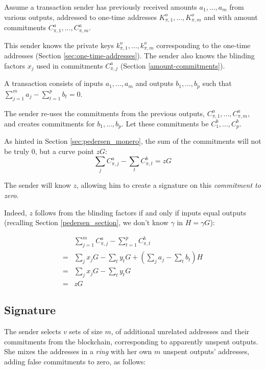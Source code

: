 Assume a transaction sender has previously received amounts $a_1, ..., a_m$ from various outputs, addressed to one-time addresses $K_{\pi,1}^o, ..., K_{\pi,m}^o$ and with amount commitments $C_{\pi,1}^a, ..., C_{\pi,m}^a$.

This sender knows the private keys $k_{\pi,1}^o, ..., k_{\pi,m}^o$ corresponding to the one-time addresses (Section \ref{sec:one-time-addresses}). The sender also knows the blinding factors $x_j$ used in commitments $C_{\pi,j}^a$ (Section \ref{amount-commitments}).

A transaction consists of inputs \(a_1, ..., a_m\) and outputs \(b_1, ..., b_p\) such that \(\sum\limits_{j=1}^m a_j - \sum\limits_{t=1}^p b_t = 0\). 
 
The sender re-uses the commitments from the previous outputs, $C_{\pi,1}^a, ..., C_{\pi,m}^a,$ and creates commitments for $b_1, ..., b_p$. Let these commitments be $C_1^b, ..., C_p^b$.

As hinted in Section \ref{sec:pedersen_monero}, the sum of the commitments will not be truly 0, but a curve point $z G$:\\
\[\sum\limits_j C^a_{\pi, j} -\sum\limits_t C^b_{\pi, t} = z G  \]

The sender will know $z$, allowing him to create a signature on this {\em commitment to zero}. 

Indeed, $z$ follows from the blinding factors if and only if inputs equal outputs (recalling Section \ref{pedersen_section}, we don’t know $\gamma$ in $H = \gamma G$):


\begin{align*}
& \sum\limits_{j=1}^m C^a_{\pi, j} - \sum\limits_{t=1}^p C^b_{\pi, t} \\
= & \sum\limits_j x_j G - \sum\limits_t y_t G + (\sum\limits_j  a_j - \sum\limits_t  b_t) H\\
= & \sum\limits_j x_j G - \sum\limits_t y_t G \\
= & z G
\end{align*}




\subsection{Signature}
\label{full-signature}



The sender selects $v$ sets of size $m$, of additional unrelated addresses and their commitments from the blockchain, corresponding to apparently unspent outputs. She mixes the addresses in a {\em ring} with her own $m$ unspent outputs' addresses, adding false commitments to zero, as follows:


